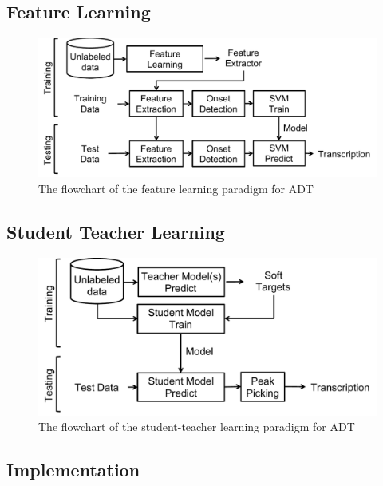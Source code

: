 \documentclass{article}
\begin{document}
\subsection{Feature Learning}
\begin{figure}
\centering
\includegraphics[width = \columnwidth]{./figs/featurelearningSys.pdf}
\caption{The flowchart of the feature learning paradigm for ADT}
\label{fig:featureLearningFlow}
\end{figure}



\subsection{Student Teacher Learning}
\begin{figure}
\centering
\includegraphics[width = \columnwidth]{./figs/studentTeacherSys.pdf}
\caption{The flowchart of the student-teacher learning paradigm for ADT}
\label{fig:featureLearningFlow}
\end{figure}




\subsection{Implementation}
\end{document}
